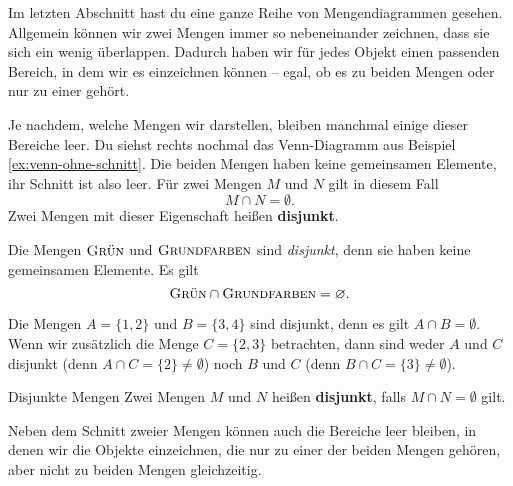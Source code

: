 \documentclass[../../main.tex]{subfiles}
\begin{document}
Im letzten Abschnitt hast du eine ganze Reihe von Mengendiagrammen gesehen. Allgemein können wir zwei Mengen immer so nebeneinander zeichnen, dass sie sich ein wenig überlappen. Dadurch haben wir für jedes Objekt einen passenden Bereich, in dem wir es einzeichnen können -- egal, ob es zu beiden Mengen oder nur zu einer gehört. 


Je nachdem, welche Mengen wir darstellen, bleiben manchmal einige dieser Bereiche leer. Du siehst rechts nochmal das Venn-Diagramm aus Beispiel \ref{ex:venn-ohne-schnitt}. Die beiden Mengen haben keine gemeinsamen Elemente, ihr Schnitt ist also leer. Für zwei Mengen $M$ und $N$ gilt in diesem Fall 
\[M\cap N=\emptyset.\]
Zwei Mengen mit dieser Eigenschaft heißen \textbf{disjunkt}.
\begin{example}{}
    Die Mengen $\textsc{Grün}$ und $\textsc{Grundfarben}$ sind \emph{disjunkt}, denn sie haben keine gemeinsamen Elemente. Es gilt
    \[\textsc{Grün}\cap\textsc{Grundfarben}=\emptyset.\]
\end{example}
\begin{example}{}
    Die Mengen $A=\{1,2\}$ und $B=\{3,4\}$ sind disjunkt, denn es gilt $A\cap B=\emptyset$. Wenn wir zusätzlich die Menge $C=\{2,3\}$ betrachten, dann sind weder $A$ und $C$ disjunkt (denn $A\cap C=\{2\}\neq\emptyset$) noch $B$ und $C$ (denn $B\cap C=\{3\}\neq\emptyset$).
\end{example}

\begin{definition}{Disjunkte Mengen}
    Zwei Mengen $M$ und $N$ heißen \textbf{disjunkt}, falls $M\cap N=\emptyset$ gilt.
\end{definition}

Neben dem Schnitt zweier Mengen können auch die Bereiche leer bleiben, in denen wir die Objekte einzeichnen, die nur zu einer der beiden Mengen gehören, aber nicht zu beiden Mengen gleichzeitig.
\end{document}
